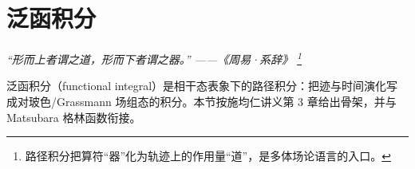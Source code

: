 \chapter{泛函积分}
\renewcommand{\currentchapterpath}{chapters/ch06/}

\begin{flushright}
\textit{“形而上者谓之道，形而下者谓之器。” ——《周易·系辞》
\footnote{路径积分把算符“器”化为轨迹上的作用量“道”，是多体场论语言的入口。}}
\end{flushright}

泛函积分（functional integral）是相干态表象下的路径积分：把迹与时间演化写成对玻色/Grassmann 场组态的积分。本节按施均仁讲义第 3 章给出骨架，并与 Matsubara 格林函数衔接。


